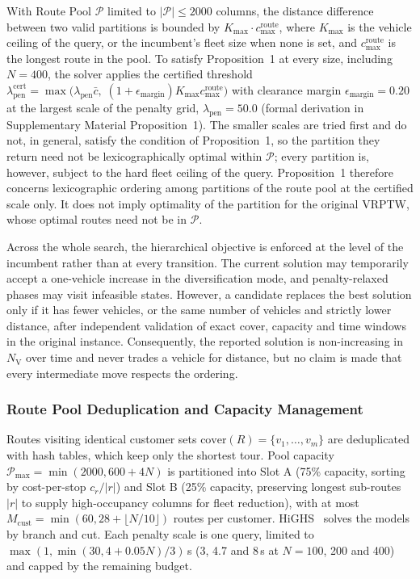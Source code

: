 \documentclass{ieeeaccess}
\newcommand{\NV}{{N_\mathrm{V}}}
\begin{document}
With Route Pool $\mathcal{P}$ limited to $|\mathcal{P}| \le 2000$ columns, the distance difference between two valid partitions is bounded by $K_{\max} \cdot c_{\max}^{\text{route}}$, where $K_{\max}$ is the vehicle ceiling of the query, or the incumbent's fleet size when none is set, and $c_{\max}^{\text{route}}$ is the longest route in the pool. To satisfy Proposition~1 at every size, including $N=400$, the solver applies the certified threshold $\lambda_{\text{pen}}^{\text{cert}} = \max\bigl(\lambda_{\text{pen}}\bar{c}, \; (1 + \epsilon_{\text{margin}}) K_{\max} c_{\max}^{\text{route}}\bigr)$ with clearance margin $\epsilon_{\text{margin}} = 0.20$ at the largest scale of the penalty grid, $\lambda_{\text{pen}} = 50.0$ (formal derivation in Supplementary Material Proposition~1). The smaller scales are tried first and do not, in general, satisfy the condition of Proposition~1, so the partition they return need not be lexicographically optimal within $\mathcal{P}$; every partition is, however, subject to the hard fleet ceiling of the query. Proposition~1 therefore concerns lexicographic ordering among partitions of the route pool at the certified scale only. It does not imply optimality of the partition for the original VRPTW, whose optimal routes need not be in $\mathcal{P}$.

Across the whole search, the hierarchical objective is enforced at the level of the incumbent rather than at every transition. The current solution may temporarily accept a one-vehicle increase in the diversification mode, and penalty-relaxed phases may visit infeasible states. However, a candidate replaces the best solution only if it has fewer vehicles, or the same number of vehicles and strictly lower distance, after independent validation of exact cover, capacity and time windows in the original instance. Consequently, the reported solution is non-increasing in $\NV$ over time and never trades a vehicle for distance, but no claim is made that every intermediate move respects the ordering.

\subsubsection{Route Pool Deduplication and Capacity Management}
Routes visiting identical customer sets $\text{cover}(R) = \{v_1, \dots, v_m\}$ are deduplicated with hash tables, which keep only the shortest tour. Pool capacity $\mathcal{P}_{\max} = \min(2000, 600 + 4N)$ is partitioned into Slot A (75\% capacity, sorting by cost-per-stop $c_r / |r|$) and Slot B (25\% capacity, preserving longest sub-routes $|r|$ to supply high-occupancy columns for fleet reduction), with at most $M_{\text{cust}} = \min(60, 28 + \lfloor N/10 \rfloor)$ routes per customer.
HiGHS~\cite{huangfu2018parallelizing} solves the models by branch and cut. Each penalty scale is one query, limited to $\max(1, \min(30, 4+0.05N)/3)$\,s (3, 4.7 and 8\,s at $N=100$, 200 and 400) and capped by the remaining budget.
\end{document}
